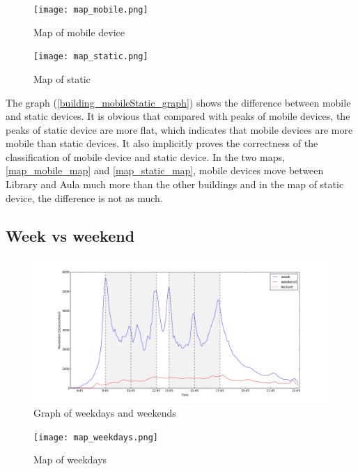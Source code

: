 \begin{figure}[H]
	\centering
	\texttt{[image: map\_mobile.png]}
	\captionsetup{justification=centering}
	\caption{Map of mobile device}
	\label{map_mobile_map}
\end{figure}

\begin{figure}[H]
	\centering
	\texttt{[image: map\_static.png]}
	\captionsetup{justification=centering}
	\caption{Map of static}
	\label{map_static_map}
\end{figure}
The graph (\autoref{building_mobileStatic_graph}) shows the difference between mobile and static devices. It is obvious that compared with peaks of mobile devices, the peaks of static device are more flat, which indicates that mobile devices are more mobile than static devices. It also implicitly proves the correctness of the classification of mobile device and static device.
In the two maps, \autoref{map_mobile_map} and \autoref{map_static_map}, mobile devices move between Library and Aula much more than the other buildings and in the map of static device, the difference is not as much.
\subsection{Week vs weekend}\label{chapter9weekweekend}
\begin{figure}[H]
	\centering
	\includegraphics[scale=0.3]{building_weekWeekend_graph.png}
	\captionsetup{justification=centering}
	\caption{Graph of weekdays and weekends}
	\label{building_weekWeekend_graph}
\end{figure}


\begin{figure}[H]
	\centering
	\texttt{[image: map\_weekdays.png]}
	\captionsetup{justification=centering}
	\caption{Map of weekdays}
	\label{weekdays_map}
\end{figure}

